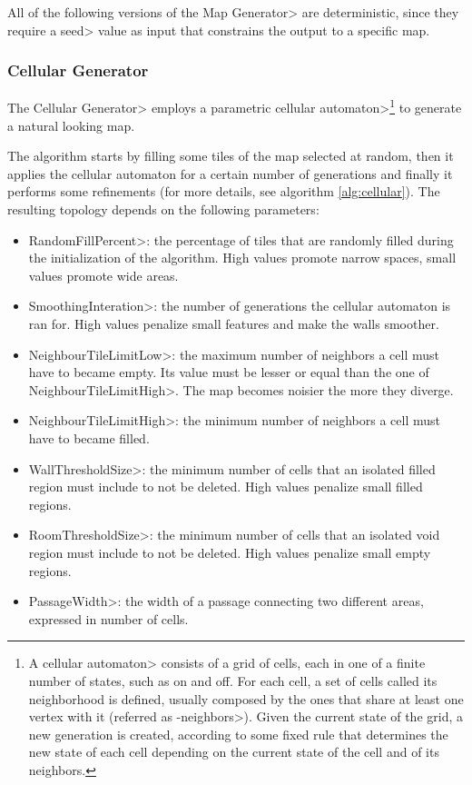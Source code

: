 All of the following versions of the \<Map Generator> are deterministic, since they require a \<seed> value as input that constrains the output to a specific map.


\subsubsection{Cellular Generator}

The \<Cellular Generator> employs a parametric \<cellular automaton>\footnote{A \<cellular automaton> consists of a grid of cells, each in one of a finite number of states, such as on and off. For each cell, a set of cells called its neighborhood is defined, usually composed by the ones that share at least one vertex with it (referred as -neighbors>). Given the current state of the grid, a new generation is created, according to some fixed rule that determines the new state of each cell depending on the current state of the cell and of its neighbors.} to generate a natural looking map. 

\par

The algorithm starts by filling some tiles of the map selected at random, then it applies the cellular automaton for a certain number of generations and finally it performs some refinements (for more details, see algorithm \ref{alg:cellular}). The resulting topology depends on the following parameters:

\begin{itemize}
\item \<RandomFillPercent>: the percentage of tiles that are randomly filled during the initialization of the algorithm. High values promote narrow spaces, small values promote wide areas.
\item \<SmoothingInteration>: the number of generations the cellular automaton is ran for. High values penalize small features and make the walls smoother. 
\item \<NeighbourTileLimitLow>: the maximum number of neighbors a cell must have to became empty. Its value must be lesser or equal than the one of \<NeighbourTileLimitHigh>. The map becomes noisier the more they diverge.
\item \<NeighbourTileLimitHigh>: the minimum number of neighbors a cell must have to became filled.
\item \<WallThresholdSize>: the minimum number of cells that an isolated filled region must include to not be deleted. High values penalize small filled regions.
\item \<RoomThresholdSize>: the minimum number of cells that an isolated void region must include to not be deleted. High values penalize small empty regions.
\item \<PassageWidth>: the width of a passage connecting two different areas, expressed in number of cells.
\end{itemize}

